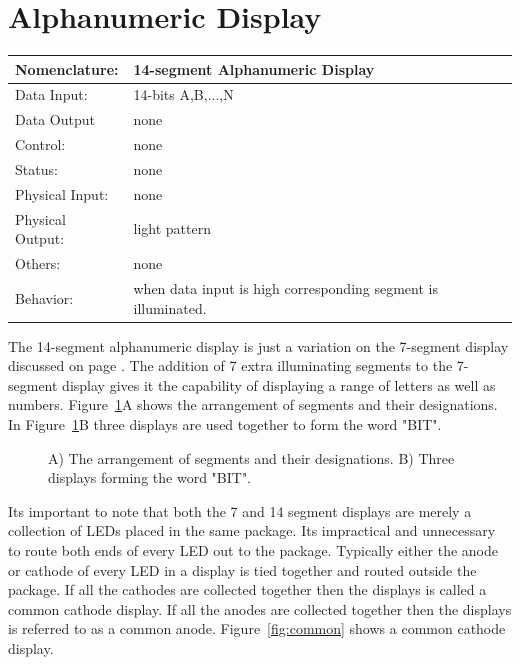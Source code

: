 \section{Alphanumeric Display}
\label{page:alpha}
\begin{tabular}{|l|p{3.5in}|} \hline
Nomenclature:  & 14-segment Alphanumeric Display  \\ \hline
Data Input:    & 14-bits A,B,...,N     \\ \hline
Data Output    & none    \\ \hline
Control:       & none           \\ \hline
Status:        & none                                   \\ \hline
Physical Input:& none		\\ \hline
Physical Output:& light pattern		\\ \hline
Others:        & none                   \\ \hline
Behavior:      & when data input is high corresponding segment 
is illuminated. \\ \hline
\end{tabular}

The 14-segment alphanumeric display is just a variation on the
7-segment display discussed on page \pageref{page:7seg}.  The addition
of 7 extra illuminating segments to the 7-segment display gives
it the capability of displaying a range of letters as well as
numbers.  Figure~\ref{fig:alpha}A shows the arrangement of segments
and their designations.  In Figure~\ref{fig:alpha}B three displays
are used together to form the word "BIT".

\begin{figure}[ht]
\caption{A) The arrangement of segments and their designations.  B) Three
displays forming the word "BIT".}
\label{fig:alpha}
\end{figure}

Its important to note that both the 7 and 14 segment displays are
merely a collection of LEDs placed in the same package.  Its impractical 
and unnecessary to route both ends of every LED out to the package.
Typically either the anode or cathode of every LED in a display is 
tied together
and routed outside the package.  If all the cathodes are collected
together then the displays is called a common cathode display.  If
all the anodes are collected together then the displays is referred
to as a common anode.  Figure~\ref{fig:common} shows a common
cathode display.

